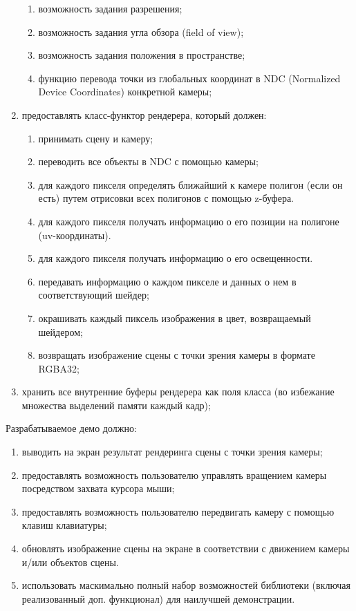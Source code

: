 \begin{enumerate}
    \begin{enumerate}
        \item возможность задания разрешения;
        \item возможность задания угла обзора (field of view);
        \item возможность задания положения в пространстве;
        \item функцию перевода точки из глобальных координат в NDC (Normalized Device Coordinates) конкретной камеры;
    \end{enumerate}
    \item предоставлять класс-функтор рендерера, который должен:
    \begin{enumerate}
        \item принимать сцену и камеру;
        \item переводить все объекты в NDC с помощью камеры;
        \item для каждого пикселя определять ближайший к камере полигон (если он есть) путем отрисовки всех полигонов с помощью z-буфера.
        \item для каждого пикселя получать информацию о его позиции на полигоне (uv-координаты).
        \item для каждого пикселя получать информацию о его освещенности.
        \item передавать информацию о каждом пикселе и данных о нем в соответствующий шейдер;
        \item окрашивать каждый пиксель изображения в цвет, возвращаемый шейдером;
        \item возвращать изображение сцены с точки зрения камеры в формате RGBA32;
    \end{enumerate}
    \item хранить все внутренние буферы рендерера как поля класса (во избежание множества выделений памяти каждый кадр);
\end{enumerate}

Разрабатываемое демо должно: 
\begin{enumerate}[resume]
    \item выводить на экран результат рендеринга сцены с точки зрения камеры;
    \item предоставлять возможность пользователю управлять вращением камеры посредством захвата курсора мыши;
    \item предоставлять возможность пользователю передвигать камеру с помощью клавиш клавиатуры;
    \item обновлять изображение сцены на экране в соответствии с движением камеры и/или объектов сцены.
    \item использовать маскимально полный набор возможностей библиотеки (включая реализованный доп. функционал) для наилучшей демонстрации.
\end{enumerate}

